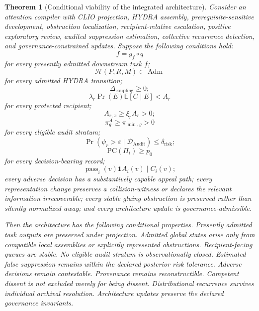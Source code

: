 \documentclass[11pt]{article}
\newtheorem{theorem}[definition]{Theorem}
\theoremstyle{definition}
\DeclareMathOperator{\Adm}{Adm}
\DeclareMathOperator{\Audit}{Audit}
\DeclareMathOperator{\Prob}{Pr}
\newcommand{\E}{\mathbb{E}}
\newcommand{\ind}{\mathbf{1}}
\newcommand{\eps}{\varepsilon}
\begin{document}
\begin{theorem}[Conditional viability of the integrated architecture]
Consider an attention compiler with CLIO projection, HYDRA assembly, prerequisite-sensitive development, obstruction localization, recipient-relative escalation, positive exploratory review, audited suppression estimation, collective recurrence detection, and governance-constrained updates. Suppose the following conditions hold:
\[
f=g_f\circ q
\]
for every presently admitted downstream task \(f\);
\[
\mathcal{H}(P,R,M)\in\Adm
\]
for every admitted HYDRA transition;
\[
\Delta_{\mathrm{coupling}}\geq0;
\]
\[
\lambda_r
\Prob(E)
\E[C\mid E]
<
A_r
\]
for every protected recipient;
\[
A_{r,x}\geq\xi_rA_r>0;
\]
\[
\pi_{g}^{A}\geq\pi_{\min,g}>0
\]
for every eligible audit stratum;
\[
\Prob(
\psi_r>\eps
\mid
\mathcal{D}_{\Audit}
)
\leq
\delta_{\mathrm{risk}};
\]
\[
\mathrm{PC}(\Pi_i)\geq p_0
\]
for every decision-bearing record;
\[
\operatorname{pass}_i(v)
\ind
A_i(v)
\mid
C_i(v);
\]
every adverse decision has a substantively capable appeal path;
every representation change preserves a collision-witness or declares the relevant information irrecoverable;
every stable gluing obstruction is preserved rather than silently normalized away;
and every architecture update is governance-admissible.

Then the architecture has the following conditional properties. Presently admitted task outputs are preserved under projection. Admitted global states arise only from compatible local assemblies or explicitly represented obstructions. Recipient-facing queues are stable. No eligible audit stratum is observationally closed. Estimated false suppression remains within the declared posterior risk tolerance. Adverse decisions remain contestable. Provenance remains reconstructible. Competent dissent is not excluded merely for being dissent. Distributional recurrence survives individual archival resolution. Architecture updates preserve the declared governance invariants.
\end{theorem}
\end{document}
